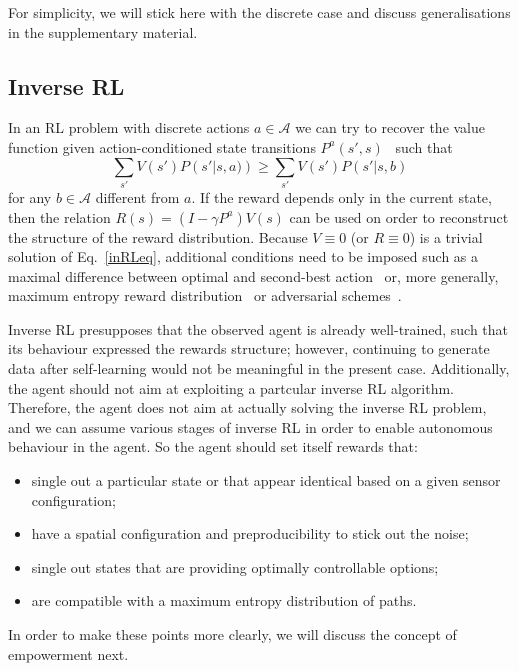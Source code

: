 \documentclass{article}
\begin{document}
For simplicity, we will stick here with the discrete case and discuss generalisations in the supplementary material.

\subsection{Inverse RL\label{invRL}}

In an RL problem with discrete actions $a \in \mathcal{A}$ we can try to recover 
the value function given action-conditioned state transitions $P^a(s',s)$~\cite{ng2000algorithms}
such that
\begin{equation}
	\sum_{s'} V\left(s'\right) P\left(s'|s,a) \right)
	\ge\sum_{s'} V\left(s'\right) P\left(s'|s,b\right)
	\label{inRLeq}
\end{equation}
for any $b \in \mathcal{A}$ different from $a$. If the reward depends only in the current state,
then the relation $R(s)=\left(I-\gamma P^{a}\right)V(s)$ can be used on order to reconstruct 
the structure of the reward distribution. Because $V\equiv 0$ (or $R\equiv 0$) is a trivial 
solution of Eq.~\ref{inRLeq},
additional conditions need to be imposed such as a maximal difference between optimal and second-best action~\cite{ng2000algorithms}  or, more generally, maximum entropy reward 
distribution~\cite{ziebart2008maximum} or adversarial schemes~\cite{pfau2016connecting}. 

Inverse RL presupposes that the observed agent is already well-trained, such that 
its behaviour expressed the rewards structure; however, continuing to generate data after
self-learning would not be meaningful in the present case. Additionally, the agent should not aim
at exploiting a partcular inverse RL algorithm. Therefore, the agent does not aim at actually 
solving the inverse RL problem, and we can assume various stages of inverse RL in order 
to enable autonomous behaviour in the agent. So the agent should set itself rewards that:
\begin{itemize}
	\item single out a particular state or that appear identical based on a given sensor configuration;
	\item have a spatial configuration and preproducibility to stick out the noise;
	\item single out states that are providing optimally controllable options;
	\item are compatible with a maximum entropy distribution of paths.
\end{itemize}
In order to make these points more clearly, we will discuss the concept of empowerment next.
\end{document}
